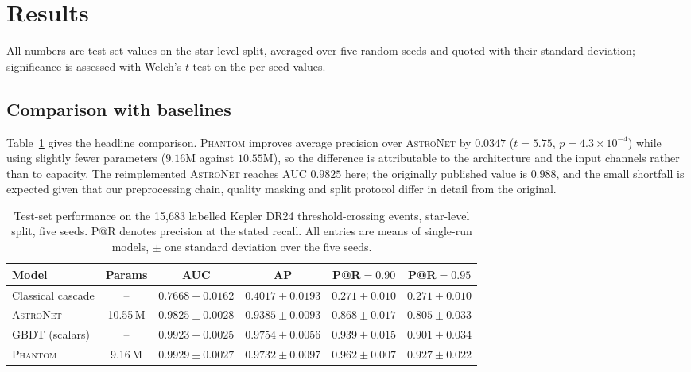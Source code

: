 \documentclass[preprint,12pt,authoryear]{elsarticle}
\newcommand{\phantomnet}{\textsc{Phantom}}
\newcommand{\astronet}{\textsc{AstroNet}}
\begin{document}
\section{Results}
\label{sec:results}

All numbers are test-set values on the star-level split, averaged over five
random seeds and quoted with their standard deviation; significance is assessed
with Welch's $t$-test on the per-seed values.

\subsection{Comparison with baselines}
\label{sec:comparison}

Table~\ref{tab:main} gives the headline comparison. \phantomnet{} improves
average precision over \astronet{} by $0.0347$ ($t = 5.75$, $p = 4.3\times
10^{-4}$) while using slightly fewer parameters ($9.16$M against $10.55$M), so
the difference is attributable to the architecture and the input channels rather
than to capacity. The reimplemented \astronet{} reaches AUC $0.9825$ here; the
originally published value is $0.988$, and the small shortfall is expected given
that our preprocessing chain, quality masking and split protocol differ in
detail from the original.

\begin{table}[t]
\centering
\caption{Test-set performance on the 15{,}683 labelled Kepler DR24
threshold-crossing events, star-level split, five seeds. P@R denotes precision
at the stated recall. All entries are means of single-run models, $\pm$ one
standard deviation over the five seeds.}
\label{tab:main}
\begin{tabular}{lccccc}
\toprule
Model & Params & AUC & AP & P@R$=0.90$ & P@R$=0.95$ \\
\midrule
Classical cascade  & --      & $0.7668 \pm 0.0162$ & $0.4017 \pm 0.0193$ & $0.271 \pm 0.010$ & $0.271 \pm 0.010$ \\
\astronet{}        & 10.55\,M & $0.9825 \pm 0.0028$ & $0.9385 \pm 0.0093$ & $0.868 \pm 0.017$ & $0.805 \pm 0.033$ \\
GBDT (scalars)     & --      & $0.9923 \pm 0.0025$ & $\mathbf{0.9754 \pm 0.0056}$ & $0.939 \pm 0.015$ & $0.901 \pm 0.034$ \\
\phantomnet{}      & 9.16\,M  & $\mathbf{0.9929 \pm 0.0027}$ & $0.9732 \pm 0.0097$ & $\mathbf{0.962 \pm 0.007}$ & $\mathbf{0.927 \pm 0.022}$ \\
\bottomrule
\end{tabular}
\end{table}
\end{document}
